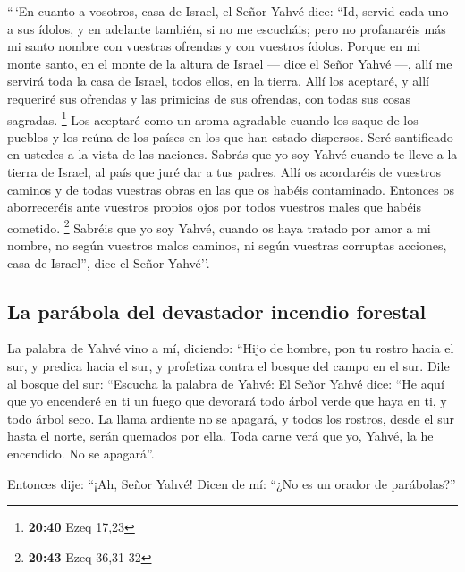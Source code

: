 \begin{paracol}{2}
 ``\,`En cuanto a vosotros, casa de Israel, el Señor
Yahvé dice: ``Id, servid cada uno a sus ídolos, y en adelante también,
si no me escucháis; pero no profanaréis más mi santo nombre con vuestras
ofrendas y con vuestros ídolos.  Porque en mi monte
santo, en el monte de la altura de Israel --- dice el Señor Yahvé ---,
allí me servirá toda la casa de Israel, todos ellos, en la tierra. Allí
los aceptaré, y allí requeriré sus ofrendas y las primicias de sus
ofrendas, con todas sus cosas sagradas. \footnote{\textbf{20:40} Ezeq
  17,23}  Los aceptaré como un aroma agradable cuando los
saque de los pueblos y los reúna de los países en los que han estado
dispersos. Seré santificado en ustedes a la vista de las naciones.
 Sabrás que yo soy Yahvé cuando te lleve a la tierra de
Israel, al país que juré dar a tus padres.  Allí os
acordaréis de vuestros caminos y de todas vuestras obras en las que os
habéis contaminado. Entonces os aborreceréis ante vuestros propios ojos
por todos vuestros males que habéis cometido. \footnote{\textbf{20:43}
  Ezeq 36,31-32}  Sabréis que yo soy Yahvé, cuando os
haya tratado por amor a mi nombre, no según vuestros malos caminos, ni
según vuestras corruptas acciones, casa de Israel'', dice el Señor
Yahvé''.

\hypertarget{la-paruxe1bola-del-devastador-incendio-forestal}{%
\subsection{La parábola del devastador incendio
forestal}\label{la-paruxe1bola-del-devastador-incendio-forestal}}

 La palabra de Yahvé vino a mí, diciendo: 
``Hijo de hombre, pon tu rostro hacia el sur, y predica hacia el sur, y
profetiza contra el bosque del campo en el sur.  Dile al
bosque del sur: ``Escucha la palabra de Yahvé: El Señor Yahvé dice: ``He
aquí que yo encenderé en ti un fuego que devorará todo árbol verde que
haya en ti, y todo árbol seco. La llama ardiente no se apagará, y todos
los rostros, desde el sur hasta el norte, serán quemados por ella.
 Toda carne verá que yo, Yahvé, la he encendido. No se
apagará''.

 Entonces dije: ``¡Ah, Señor Yahvé! Dicen de mí: ``¿No es
un orador de parábolas?''

\switchcolumn
\begin{otherlanguage}{english}


\end{otherlanguage}
\end{paracol}
